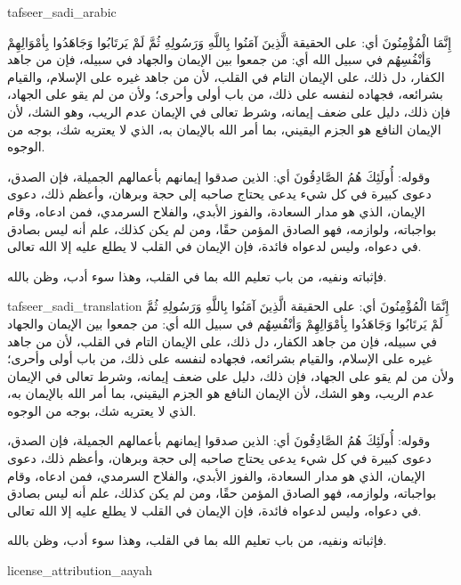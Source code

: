 \begin{taggedblock}{tafseer_sadi_arabic}
\begin{Arabic}
{ إِنَّمَا الْمُؤْمِنُونَ }
أي: على الحقيقة
{ الَّذِينَ آمَنُوا بِاللَّهِ وَرَسُولِهِ ثُمَّ لَمْ يَرتَابُوا وَجَاهَدُوا بِأمْوَالِهِمْ وَأنْفُسِهُم في سبيل الله }
أي: من جمعوا بين الإيمان والجهاد في سبيله، فإن من جاهد الكفار، دل ذلك، على الإيمان التام في القلب، لأن من جاهد غيره على الإسلام، والقيام بشرائعه، فجهاده لنفسه على ذلك، من باب أولى وأحرى؛ ولأن من لم يقو على الجهاد، فإن ذلك، دليل على ضعف إيمانه، وشرط تعالى في الإيمان عدم الريب، وهو الشك، لأن الإيمان النافع هو الجزم اليقيني، بما أمر الله بالإيمان به، الذي لا يعتريه شك، بوجه من الوجوه.

وقوله:
{ أُولَئِكَ هُمُ الصَّادِقُونَ }
أي: الذين صدقوا إيمانهم بأعمالهم الجميلة، فإن الصدق، دعوى كبيرة في كل شيء يدعى يحتاج صاحبه إلى حجة وبرهان، وأعظم ذلك، دعوى الإيمان، الذي هو مدار السعادة، والفوز الأبدي، والفلاح السرمدي، فمن ادعاه، وقام بواجباته، ولوازمه، فهو الصادق المؤمن حقًا، ومن لم يكن كذلك، علم أنه ليس بصادق في دعواه، وليس لدعواه فائدة، فإن الإيمان في القلب لا يطلع عليه إلا الله تعالى.

فإثباته ونفيه، من باب تعليم الله بما في القلب، وهذا سوء أدب، وظن بالله.
\end{Arabic}
\end{taggedblock}
\begin{taggedblock}{tafseer_sadi_translation}
{ إِنَّمَا الْمُؤْمِنُونَ }
أي: على الحقيقة
{ الَّذِينَ آمَنُوا بِاللَّهِ وَرَسُولِهِ ثُمَّ لَمْ يَرتَابُوا وَجَاهَدُوا بِأمْوَالِهِمْ وَأنْفُسِهُم في سبيل الله }
أي: من جمعوا بين الإيمان والجهاد في سبيله، فإن من جاهد الكفار، دل ذلك، على الإيمان التام في القلب، لأن من جاهد غيره على الإسلام، والقيام بشرائعه، فجهاده لنفسه على ذلك، من باب أولى وأحرى؛ ولأن من لم يقو على الجهاد، فإن ذلك، دليل على ضعف إيمانه، وشرط تعالى في الإيمان عدم الريب، وهو الشك، لأن الإيمان النافع هو الجزم اليقيني، بما أمر الله بالإيمان به، الذي لا يعتريه شك، بوجه من الوجوه.

وقوله:
{ أُولَئِكَ هُمُ الصَّادِقُونَ }
أي: الذين صدقوا إيمانهم بأعمالهم الجميلة، فإن الصدق، دعوى كبيرة في كل شيء يدعى يحتاج صاحبه إلى حجة وبرهان، وأعظم ذلك، دعوى الإيمان، الذي هو مدار السعادة، والفوز الأبدي، والفلاح السرمدي، فمن ادعاه، وقام بواجباته، ولوازمه، فهو الصادق المؤمن حقًا، ومن لم يكن كذلك، علم أنه ليس بصادق في دعواه، وليس لدعواه فائدة، فإن الإيمان في القلب لا يطلع عليه إلا الله تعالى.

فإثباته ونفيه، من باب تعليم الله بما في القلب، وهذا سوء أدب، وظن بالله.
\end{taggedblock}
\begin{taggedblock}{license_attribution_aayah}

\end{taggedblock}
\begin{comment}
Please use the following for footnotes:- Sample\footnoteQ{Text of Qur'an footnote goes here.}.
Sample\footnoteT{Text of Tafseer footnote goes here.}.
\end{comment}